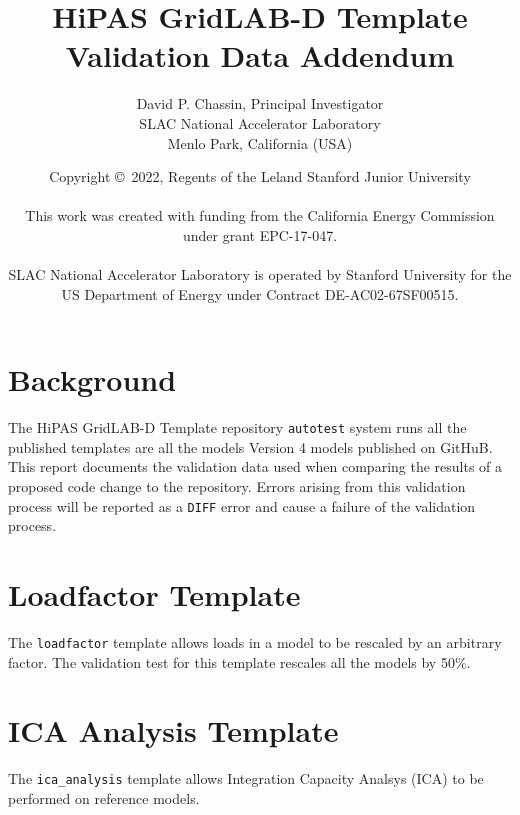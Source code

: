 \documentclass{article}
\title
{
	HiPAS GridLAB-D Template Validation Data Addendum
}
\author
{
	David P. Chassin, Principal Investigator
\\
	SLAC National Accelerator Laboratory
\\
	Menlo Park, California (USA) 
}
\date
{
	Copyright \copyright\ 2022, Regents of the Leland Stanford Junior University
\\~\\
	This work was created with funding from the California Energy Commission under grant EPC-17-047.
\\~\\
	SLAC National Accelerator Laboratory is operated by Stanford University for the US Department of Energy
	under Contract DE-AC02-67SF00515.
}
\def\code#1{\texttt{#1}}
\begin{document}
\maketitle

\newpage

\tableofcontents

\newpage

\listoftables

\newpage

\section{Background}

The HiPAS GridLAB-D Template repository \code{autotest} system runs all the published templates are all the models Version 4 models published on GitHuB. This report documents the validation data used when comparing the results of a proposed code change to the repository. Errors arising from this validation process will be reported as a \code{DIFF} error and cause a failure of the validation process.

\section{Loadfactor Template}

The \code{loadfactor} template allows loads in a model to be rescaled by an arbitrary factor. The validation test for this template rescales all the models by 50\%.



\section{ICA Analysis Template}

The \code{ica\_analysis} template allows Integration Capacity Analsys (ICA) to be performed on reference models. 



\end{document}
